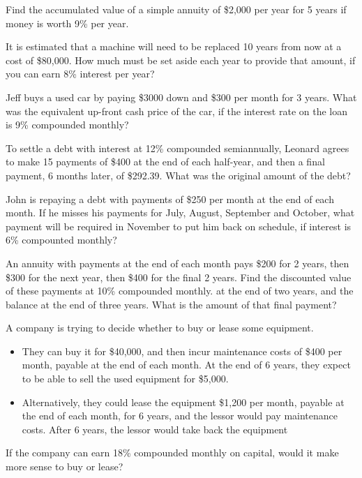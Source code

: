 \documentclass[12pt]{exam}
\begin{document}
\vspace{2in}  %

\begin{questions}

    \question Find the accumulated value of a simple annuity of \$2,000 per year for 5 years
    if money is worth 9\% per year.
    \vspace{1.25in}

    \question It is estimated that a machine will need to be replaced 10 years from now at a cost of \$80,000.  How
    much must be set aside each year to provide that amount, if you can earn 8\% interest per year?
    \vspace{1.5in}

    \question Jeff buys a used car by paying \$3000 down and \$300 per month for 3 years.  What was the
    equivalent up-front cash price of the car, if the interest rate on the loan is 9\% compounded monthly?
    \vspace{2in}

    \question To settle a debt with interest at 12\% compounded semiannually, Leonard agrees to make 15
    payments of \$400 at the end of each half-year, and then a final payment, 6 months later, of \$292.39.
    What was the original amount of the debt?
    \vspace{2in}

    \question John is repaying a debt with payments of \$250 per month at the end of each month.  If he misses his
    payments for July, August, September and October, what payment will be required in November to put him back on
    schedule, if interest is 6\% compounted monthly?
    \vspace{2in}

    \question An annuity with payments at the end of each month pays \$200 for 2 years, then \$300 for the next year, then
    \$400 for the final 2 years.  Find the discounted value of these payments at 10\% compounded monthly.
    at the end of two years, and the balance at the end of three years.  What is the amount of that final payment?
    \vspace{1.5in}

    \question A company is trying to decide whether to buy or lease some equipment.
    \begin{itemize}
        \item They can buy it for \$40,000, and then incur maintenance costs of \$400 per month, payable at the end of each
              month.  At the end of 6 years, they expect to be able to sell the used equipment for \$5,000.
        \item Alternatively, they could lease the equipment \$1,200 per month, payable at the end of each month, for
              6 years, and the lessor would pay maintenance costs.  After 6 years, the lessor would take back the equipment
    \end{itemize}
    If the company can earn 18\% compounded monthly on capital, would it make more sense to buy or lease?
    \vspace{1.5in}

\end{questions}
\end{document}
